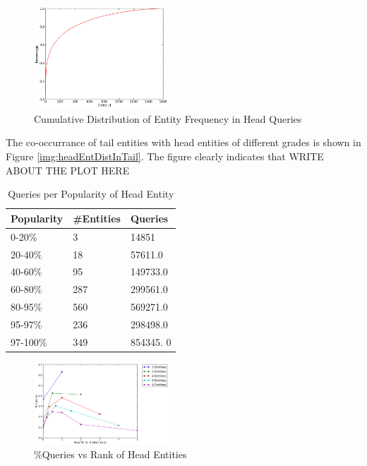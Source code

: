 \begin{figure}[t]
\label{img:headEntDist}
\caption{Cumulative Distribution of Entity Frequency in Head Queries}
  \centering
    \includegraphics[width = 0.45\textwidth]{images/entity-head-dist.png}
\end{figure}



The co-occurrance of tail entities with head entities of different grades is shown in 
Figure \ref{img:headEntDistInTail}. The figure clearly indicates that 
WRITE ABOUT THE PLOT HERE

 
\begin{table}
\caption{Queries per Popularity of Head Entity}
\label{table:headEntQueryDist}
\centering
\begin{tabular}{|l|l|l|}
\hline
Popularity & \#Entities & Queries \\ \hline
0-20\% & 3 & 14851 \\ \hline
20-40\% & 18  & 57611.0 \\ \hline
40-60\% & 95 & 149733.0 \\ \hline
60-80\% & 287 & 299561.0 \\ \hline
80-95\% & 560 & 569271.0 \\ \hline
95-97\% & 236 & 298498.0 \\ \hline
97-100\% & 349 & 854345. 0  \\ \hline
\end{tabular}
\end{table}


\begin{figure}[t]
\label{img:headRankInTail}
\caption{\%Queries vs Rank of Head Entities}
  \centering
    \includegraphics[width = 0.45\textwidth]{images/entity-head-query-ratio-dist.png}
\end{figure}

